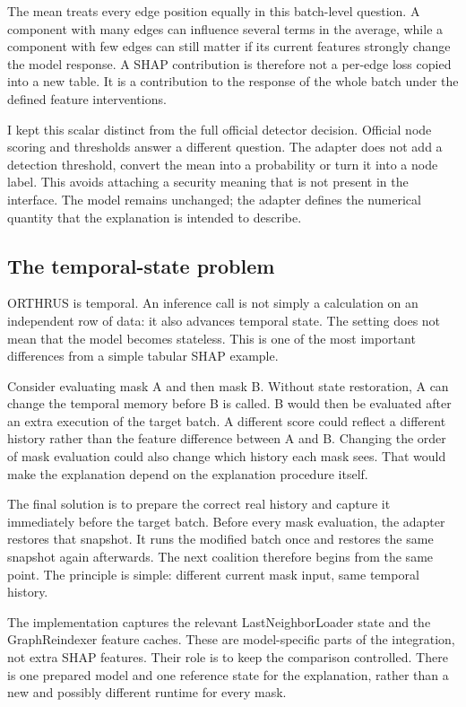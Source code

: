\documentclass[11pt,a4paper]{article}
\newcommand{\code}[1]{\texttt{\detokenize{#1}}}
\begin{document}
The mean treats every edge position equally in this batch-level question. A
component with many edges can influence several terms in the average, while a
component with few edges can still matter if its current features strongly
change the model response. A SHAP contribution is therefore not a per-edge
loss copied into a new table. It is a contribution to the response of the
whole batch under the defined feature interventions.

I kept this scalar distinct from the full official detector decision. Official
node scoring and thresholds answer a different question. The adapter does not
add a detection threshold, convert the mean into a probability or turn it into
a node label. This avoids attaching a security meaning that is not present in
the interface. The model remains unchanged; the adapter defines the numerical
quantity that the explanation is intended to describe.

\subsection{The temporal-state problem}
ORTHRUS is temporal. An inference call is not simply a calculation on an
independent row of data: it also advances temporal state. The setting
\code{inference=True} does not mean that the model becomes stateless. This is
one of the most important differences from a simple tabular SHAP example.

Consider evaluating mask A and then mask B. Without state restoration, A can
change the temporal memory before B is called. B would then be evaluated after
an extra execution of the target batch. A different score could reflect a
different history rather than the feature difference between A and B. Changing
the order of mask evaluation could also change which history each mask sees.
That would make the explanation depend on the explanation procedure itself.

The final solution is to prepare the correct real history and capture it
immediately before the target batch. Before every mask evaluation, the adapter
restores that snapshot. It runs the modified batch once and restores the same
snapshot again afterwards. The next coalition therefore begins from the same
point. The principle is simple: different current mask input, same temporal
history.

The implementation captures the relevant LastNeighborLoader state and the
GraphReindexer feature caches. These are model-specific parts of the integration,
not extra SHAP features. Their role is to keep the comparison controlled.
There is one prepared model and one reference state for the explanation, rather
than a new and possibly different runtime for every mask.
\end{document}
